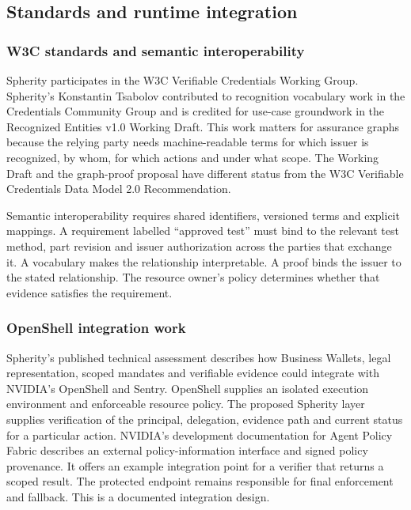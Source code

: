 \subsection{Standards and runtime integration}

\subsubsection{W3C standards and semantic interoperability}

Spherity participates in the W3C Verifiable Credentials Working Group. Spherity's Konstantin Tsabolov contributed to recognition vocabulary work in the Credentials Community Group and is credited for use-case groundwork in the Recognized Entities v1.0 Working Draft. This work matters for assurance graphs because the relying party needs machine-readable terms for which issuer is recognized, by whom, for which actions and under what scope. The Working Draft and the graph-proof proposal have different status from the W3C Verifiable Credentials Data Model 2.0 Recommendation.~\cite{src6,src12,src87,src88,src89}

Semantic interoperability requires shared identifiers, versioned terms and explicit mappings. A requirement labelled ``approved test'' must bind to the relevant test method, part revision and issuer authorization across the parties that exchange it. A vocabulary makes the relationship interpretable. A proof binds the issuer to the stated relationship. The resource owner's policy determines whether that evidence satisfies the requirement.~\cite{src6,src8,src13,src17}

\subsubsection{OpenShell integration work}

Spherity's published technical assessment describes how Business Wallets, legal representation, scoped mandates and verifiable evidence could integrate with NVIDIA's OpenShell and Sentry. OpenShell supplies an isolated execution environment and enforceable resource policy. The proposed Spherity layer supplies verification of the principal, delegation, evidence path and current status for a particular action. NVIDIA's development documentation for Agent Policy Fabric describes an external policy-information interface and signed policy provenance. It offers an example integration point for a verifier that returns a scoped result. The protected endpoint remains responsible for final enforcement and fallback. This is a documented integration design.~\cite{src5,src7,src11,src42,src49,src90}

